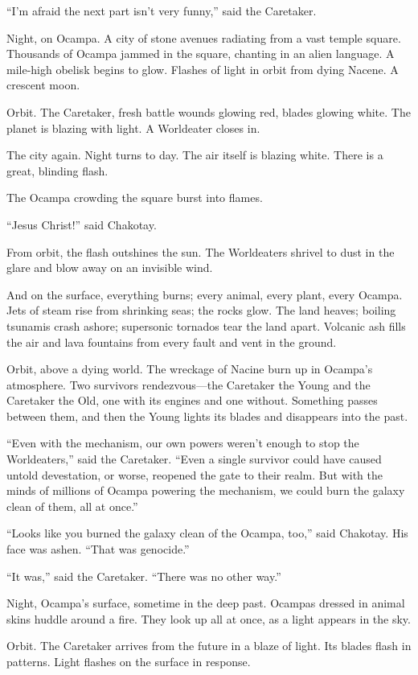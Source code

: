 \documentclass[twoside,letterpaper,12pt]{memoir}
\begin{document}
``I’m afraid the next part isn’t very funny,” said the Caretaker. 

Night, on Ocampa. A city of stone avenues radiating from a vast temple square. Thousands of Ocampa jammed in the square, chanting in an alien language. A mile-high obelisk begins to glow. Flashes of light in orbit from dying Nacene. A crescent moon. 

Orbit. The Caretaker, fresh battle wounds glowing red, blades glowing white. The planet is blazing with light. A Worldeater closes in. 

The city again. Night turns to day. The air itself is blazing white. There is a great, blinding flash. 

The Ocampa crowding the square burst into flames. 

``Jesus Christ!” said Chakotay. 

From orbit, the flash outshines the sun. The Worldeaters shrivel to dust in the glare and blow away on an invisible wind. 

And on the surface, everything burns; every animal, every plant, every Ocampa. Jets of steam rise from shrinking seas; the rocks glow. The land heaves; boiling tsunamis crash ashore; supersonic tornados tear the land apart. Volcanic ash fills the air and lava fountains from every fault and vent in the ground. 

Orbit, above a dying world. The wreckage of Nacine burn up in Ocampa’s atmosphere. Two survivors rendezvous—the Caretaker the Young and the Caretaker the Old, one with its engines and one without. Something passes between them, and then the Young lights its blades and disappears into the past. 

``Even with the mechanism, our own powers weren’t enough to stop the Worldeaters,” said the Caretaker. ``Even a single survivor could have caused untold devestation, or worse, reopened the gate to their realm. But with the minds of millions of Ocampa powering the mechanism, we could burn the galaxy clean of them, all at once.” 

``Looks like you burned the galaxy clean of the Ocampa, too,” said Chakotay. His face was ashen. ``That was genocide.” 

``It was,” said the Caretaker. ``There was no other way.” 

Night, Ocampa’s surface, sometime in the deep past. Ocampas dressed in animal skins huddle around a fire. They look up all at once, as a light appears in the sky. 

Orbit. The Caretaker arrives from the future in a blaze of light. Its blades flash in patterns. Light flashes on the surface in response. 
\end{document}
